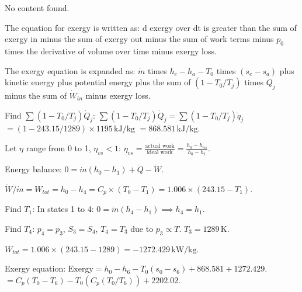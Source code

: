 No content found.

The equation for exergy is written as:  
d exergy over dt is greater than the sum of exergy in minus the sum of exergy out minus the sum of work terms minus \( p_0 \) times the derivative of volume over time minus exergy loss.  

The exergy equation is expanded as:  
\( \dot{m} \) times \( h_e - h_a - T_0 \) times \( (s_e - s_a) \) plus kinetic energy plus potential energy plus the sum of \( (1 - T_0 / T_j) \) times \( \dot{Q}_j \) minus the sum of \( \dot{W}_{in} \) minus exergy loss.  

Find \( \sum (1 - T_0 / T_j) \dot{Q}_j \):  
\( \sum (1 - T_0 / T_j) \dot{Q}_j = \sum (1 - T_0 / T_j) \dot{q}_j \)  
\( = (1 - 243.15 / 1289) \times 1195 \, \text{kJ/kg} \)  
\( = 868.581 \, \text{kJ/kg} \).  

Let \( \eta \) range from 0 to 1, \( \eta_{vs} < 1 \):  
\( \eta_{vs} = \frac{\text{actual work}}{\text{ideal work}} = \frac{h_0 - h_{ns}}{h_0 - h_1} \).  

Energy balance:  
\( 0 = \dot{m} (h_0 - h_1) + \dot{Q} - \dot{W} \).  

\( \dot{W} / \dot{m} = W_{tot} = h_0 - h_4 = C_p \times (T_0 - T_1) = 1.006 \times (243.15 - T_1) \).  

Find \( T_1 \):  
In states 1 to 4:  
\( 0 = \dot{m} (h_4 - h_1) \implies h_4 = h_1 \).  

Find \( T_4 \):  
\( p_4 = p_3 \), \( S_3 = S_4 \), \( T_4 = T_3 \) due to \( p_3 \propto T \).  
\( T_3 = 1289 \, \text{K} \).  

\( W_{tot} = 1.006 \times (243.15 - 1289) = -1272.429 \, \text{kW/kg} \).  

Exergy equation:  
\( \text{Exergy} = h_0 - h_6 - T_0 (s_0 - s_6) + 868.581 + 1272.429 \).  
\( = C_p (T_0 - T_6) - T_0 \left( C_p \left( T_0 / T_6 \right) \right) + 2202.02 \).
